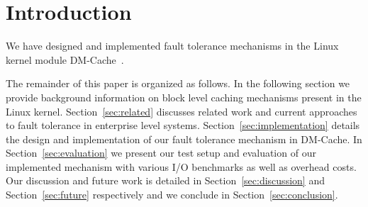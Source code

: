 \section{Introduction}

We have designed and implemented fault tolerance mechanisms in the
Linux kernel module DM-Cache~\cite{DM-Cache}.

The remainder of this paper is organized as follows. In the following
section we provide background information on block level caching
mechanisms present in the Linux kernel. Section~\ref{sec:related}
discusses related work and current approaches to fault tolerance in
enterprise level systems. Section~\ref{sec:implementation} details the
design and implementation of our fault tolerance mechanism in
DM-Cache. In Section~\ref{sec:evaluation} we present our test setup
and evaluation of our implemented mechanism with various I/O
benchmarks as well as overhead costs. Our discussion and future work
is detailed in Section~\ref{sec:discussion} and
Section~\ref{sec:future} respectively and we conclude in
Section~\ref{sec:conclusion}.
